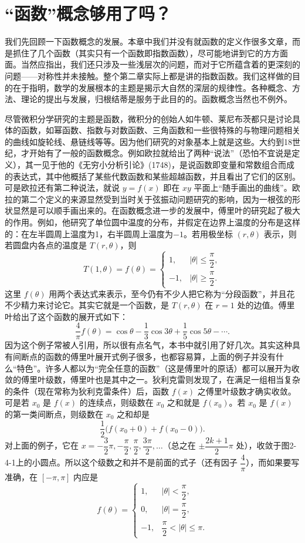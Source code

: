 \section{“函数”概念够用了吗？}

我们先回顾一下函数概念的发展。本章中我们并没有就函数的定义作很多文章，而是抓住了几个函数（其实只有一个函数即指数函数），尽可能地讲到它的方方面面。当然应指出，我们还只涉及一些浅层次的问题，而对于它所蕴含着的更深刻的问题——对称性并未接触。整个第二章实际上都是讲的指数函数。我们这样做的目的在于指明，数学的发展根本的主题是揭示大自然的深层的规律性。各种概念、方法、理论的提出与发展，归根结蒂是服务于此目的的。函数概念当然也不例外。

尽管微积分学研究的主题是函数，微积分的创始人如牛顿、莱尼布茨都只是讨论具体的函数，如幂函数、指数与对数函数、三角函数和一些很特殊的与物理问题相关的曲线如旋轮线、悬链线等等。因为他们研究的对象基本上就是这些。大约到18世纪，才开始有了一般的函数概念。例如欧拉就给出了两种“说法”（恐怕不宜说是定义），其一见于他的《无穷小分析引论》(1748)，是说函数即变量和常数组合而成的表达式，其中他概括了某些代数函数和某些超越函数，并且看出了它们的区别。可是欧拉还有第二种说法，就说 $y=f(x)$ 即在 $xy$ 平面上“随手画出的曲线”。欧拉的第二个定义的来源显然受到当时关于弦振动问题研究的影响，因为一根弦的形状显然是可以顺手画出来的。在函数概念进一步的发展中，傅里叶的研究起了极大的作用。例如，他研究了单位圆中温度的分布，并假定在边界上温度的分布是这样的：在左半圆周上温度为1，右半圆周上温度为$-1$。若用极坐标 $(r,\theta)$ 表示，则若圆盘内各点的温度是 $T(r,\theta)$，则
\[
T(1,\theta)=f(\theta)=
\begin{cases}
 1, & |\theta|\le \dfrac{\pi}{2},\\[4pt]
 -1, & |\theta|\ge \dfrac{\pi}{2}.
\end{cases}
\]
这里 $f(\theta)$ 用两个表达式来表示，至今仍有不少人把它称为“分段函数”，并且花不少精力来讨论它。其实它就是一个函数，是 $T(r,\theta)$ 在 $r=1$ 处的边值。傅里叶给出了这个函数的展开式如下：
\[
\frac{4}{\pi}f(\theta)=\cos\theta-\frac13\cos3\theta+\frac15\cos5\theta-\cdots.
\]
因为这个例子常被人引用，所以很有点名气，本书中就引用了好几次。其实这种具有间断点的函数的傅里叶展开式例子很多，也都容易算，上面的例子并没有什么“特色”。许多人都以为“完全任意的函数”（这是傅里叶的原话）都可以展开为收敛的傅里叶级数，傅里叶也是其中之一。狄利克雷则发现了，在满足一组相当复杂的条件（现在常称为狄利克雷条件）后，函数 $f(x)$ 之傅里叶级数才确实收敛。可是若 $x_0$ 是 $f(x)$ 的连续点，则级数在 $x_0$ 之和就是 $f(x_0)$。若 $x_0$ 是 $f(x)$ 的第一类间断点，则级数在 $x_0$ 之和却是
\[
\frac12\bigl(f(x_0+0)+f(x_0-0)\bigr).
\]
对上面的例子，它在 $x=-\dfrac{3}{2}\pi,-\dfrac{\pi}{2},\dfrac{\pi}{2},\dfrac{3\pi}{2},\ldots$（总之在 $\pm\dfrac{2k+1}{2}\pi$ 处），收敛于图2-4-1上的小圆点。所以这个级数之和并不是前面的式子（还有因子 $\dfrac4\pi$），而如果要写准确，在 $[-\pi,\pi]$ 内应是
\[
f(\theta)=
\begin{cases}
 1, & |\theta|<\dfrac{\pi}{2},\\[4pt]
 0, & |\theta|=\dfrac{\pi}{2},\\[4pt]
 -1, & \dfrac{\pi}{2}<|\theta|\le\pi.
\end{cases}
\]

